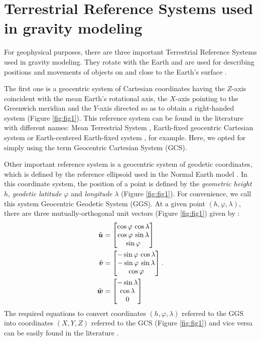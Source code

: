 \documentclass[extra]{gji}
\begin{document}
\section{Terrestrial Reference Systems used in gravity modeling}

For geophysical purposes, there are three important Terrestrial Reference Systems used in gravity modeling. 
They rotate with the Earth and are used for describing
positions and movements of objects on and close to the Earth’s surface
\citep{torge2012}.

The first one is a geocentric system of Cartesian coordinates having 
the $Z$-axis coincident with the mean Earth's rotational axis,
the $X$-axis pointing to the Greenwich meridian and the $Y$-axis
directed so as to obtain a right-handed system (Figure \ref{fig:fig1}).
This reference system can be found in the literature with different names: Mean Terrestrial System \citep[e.g.,][]{soler1976}, Earth-fixed geocentric Cartesian system \citep[e.g.,][]{torge2012} 
or Earth-centered Earth-fixed system \citep[e.g.,][]{bouman_etal2013}, for example. Here, we opted for simply using the term Geocentric Cartesian System (GCS).

Other important reference system is a geocentric system of 
geodetic coordinates, which is defined by the reference ellipsoid 
used in the Normal Earth model \citep{heiskanen-moritz1967, soler1976, 
torge2012, bouman_etal2013}. 
In this coordinate system, the position of a point 
is defined by the \textit{geometric height} $h$, 
\textit{geodetic latitude} $\varphi$ and \textit{longitude} $\lambda$ (Figure \ref{fig:fig1}).
For convenience, we call this system Geocentric Geodetic System
(GGS). 
At a given point $(h, \varphi, \lambda)$, there are three 
mutually-orthogonal unit vectors (Figure \ref{fig:fig1}) given by \citep{soler1976}:
\begin{equation}
\begin{split}
\hat{\mitbf{u}} &= 
\begin{bmatrix}
\cos\varphi \, \cos\lambda \\
\cos\varphi \, \sin\lambda \\
\sin\varphi
\end{bmatrix} \\
\hat{\mitbf{v}} &= 
\begin{bmatrix}
-\sin\varphi \, \cos\lambda \\
-\sin\varphi \, \sin\lambda \\
\cos\varphi
\end{bmatrix} \\
\hat{\mitbf{w}} &= 
\begin{bmatrix}
-\sin\lambda \\
\cos\lambda \\
0
\end{bmatrix}
\end{split} \: .
\label{eq:unit-vectors}
\end{equation}
The required equations to convert coordinates $(h, \varphi, 
\lambda)$ referred to the GGS into coordinates $(X, Y, Z)$ referred to 
the GCS (Figure \ref{fig:fig1}) and vice versa can be easily found in 
the literature \citep[e.g.,][]{heiskanen-moritz1967, torge2012, 
bouman_etal2013}.
\end{document}
